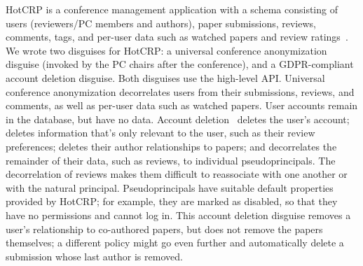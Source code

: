 %
HotCRP is a conference management application with a schema consisting of users
(reviewers/PC members and authors), paper submissions, reviews, comments, tags,
and per-user data such as watched papers and review ratings~\cite{hotcrp}.
%
We wrote two disguises for HotCRP: a universal conference anonymization disguise
(invoked by the PC chairs after the conference), and a GDPR-compliant account
deletion disguise.
%
Both disguises use the high-level \sys API.
%
%
Universal conference anonymization decorrelates users from their submissions,
reviews, and comments, as well as per-user data such as watched papers.
%
User accounts remain in the database, but have no data.
%
Account deletion \one{} deletes the user's account; \two{} deletes information
that's only relevant to the user, such as their review preferences;
\three{} deletes their author relationships to papers; and
\four{} decorrelates the remainder of their data, such as reviews, to
individual pseudoprincipals.
%
The decorrelation of reviews makes them difficult to reassociate with one
another or with the natural principal.
%
Pseudoprincipals have suitable default properties provided by HotCRP; for example,
they are marked as disabled, so that they have no permissions and cannot log in.
%
This account deletion disguise removes a user's relationship to co-authored papers,
but does not remove the papers themselves; a different policy might go even
further and automatically delete a submission whose last author is removed.
%

